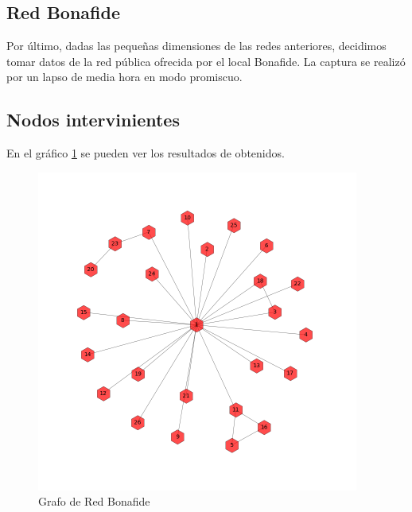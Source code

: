 



\subsection{Red Bonafide}
 Por último, dadas las peque\~nas dimensiones de las redes anteriores, decidimos tomar datos de la red pública ofrecida por el local Bonafide. La captura se realizó por un lapso de media hora en modo promiscuo.

\subsection{Nodos intervinientes}

En el gráfico \ref{bonafide:graph} se pueden ver los resultados de obtenidos.

\begin{figure}[h!]
    \centering                                                       
    \includegraphics[width=300pt]{img/bonafideGraph.png}
    \caption{Grafo de Red Bonafide}
    \label{bonafide:graph}
\end{figure}

